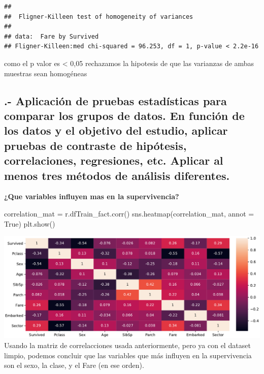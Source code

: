 \documentclass[
]{article}
\newenvironment{Shaded}{\begin{snugshade}}{\end{snugshade}}
\newcommand{\NormalTok}[1]{\textcolor[rgb]{0.80,0.80,0.80}{#1}}
\newcommand{\OperatorTok}[1]{\textcolor[rgb]{0.94,0.94,0.82}{#1}}
\newcommand{\VariableTok}[1]{\textcolor[rgb]{0.80,0.80,0.80}{#1}}
\begin{document}
\begin{verbatim}
## 
##  Fligner-Killeen test of homogeneity of variances
## 
## data:  Fare by Survived
## Fligner-Killeen:med chi-squared = 96.253, df = 1, p-value < 2.2e-16
\end{verbatim}

como el p valor es \textless{} 0,05 rechazamos la hipotesis de que las
varianzas de ambas muestras sean homogéneas

\hypertarget{aplicaciuxf3n-de-pruebas-estaduxedsticas-para-comparar-los-grupos-de-datos.-en-funciuxf3n-de-los-datos-y-el-objetivo-del-estudio-aplicar-pruebas-de-contraste-de-hipuxf3tesis-correlaciones-regresiones-etc.-aplicar-al-menos-tres-muxe9todos-de-anuxe1lisis-diferentes.}{%
\subsection{.- Aplicación de pruebas estadísticas para comparar los
grupos de datos. En función de los datos y el objetivo del estudio,
aplicar pruebas de contraste de hipótesis, correlaciones, regresiones,
etc. Aplicar al menos tres métodos de análisis
diferentes.}\label{aplicaciuxf3n-de-pruebas-estaduxedsticas-para-comparar-los-grupos-de-datos.-en-funciuxf3n-de-los-datos-y-el-objetivo-del-estudio-aplicar-pruebas-de-contraste-de-hipuxf3tesis-correlaciones-regresiones-etc.-aplicar-al-menos-tres-muxe9todos-de-anuxe1lisis-diferentes.}}

\textbf{¿Que variables influyen mas en la supervivencia?}

\begin{Shaded}
\begin{Highlighting}[]
\NormalTok{correlation_mat }\OperatorTok{=}\NormalTok{ r.dfTrain_fact.corr()}
\NormalTok{sns.heatmap(correlation_mat, annot }\OperatorTok{=} \VariableTok{True}\NormalTok{)}
\NormalTok{plt.show()}
\end{Highlighting}
\end{Shaded}

\includegraphics{m2851_PRA2_aruizplaza_rcotillas_files/figure-latex/unnamed-chunk-31-1.pdf}
Usando la matriz de correlacciones usada anteriormente, pero ya con el
dataset limpio, podemos concluir que las variables que más influyen en
la supervivencia son el sexo, la clase, y el Fare (en ese orden).
\end{document}
